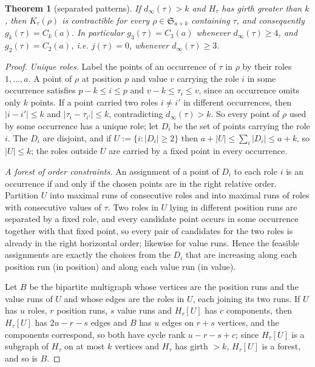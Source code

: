 \documentclass[11pt,reqno]{amsart}
\theoremstyle{plain}
\newtheorem{theorem}{Theorem}[section]
\theoremstyle{definition}
\theoremstyle{remark}
\newcommand{\Sym}{\mathfrak{S}}
\begin{document}
\begin{theorem}[separated patterns]\label{thm:separated}
If $d_\infty(\tau)>k$ and $H_\tau$ has girth greater than $k$, then $K_\tau(\rho)$ is contractible for every $\rho\in\Sym_{a+k}$ containing $\tau$, and consequently $g_k(\tau)=C_k(a)$. In particular $g_3(\tau)=C_3(a)$ whenever $d_\infty(\tau)\ge4$, and $g_2(\tau)=C_2(a)$, i.e. $j(\tau)=0$, whenever $d_\infty(\tau)\ge3$.
\end{theorem}

\begin{proof}
\emph{Unique roles.} Label the points of an occurrence of $\tau$ in $\rho$ by their roles $1,\dots,a$. A point of $\rho$ at position $p$ and value $v$ carrying the role $i$ in some occurrence satisfies $p-k\le i\le p$ and $v-k\le\tau_i\le v$, since an occurrence omits only $k$ points. If a point carried two roles $i\ne i'$ in different occurrences, then $|i-i'|\le k$ and $|\tau_i-\tau_{i'}|\le k$, contradicting $d_\infty(\tau)>k$. So every point of $\rho$ used by some occurrence has a unique role; let $D_i$ be the set of points carrying the role $i$. The $D_i$ are disjoint, and if $U:=\{i:|D_i|\ge2\}$ then $a+|U|\le\sum_i|D_i|\le a+k$, so $|U|\le k$; the roles outside $U$ are carried by a fixed point in every occurrence.

\emph{A forest of order constraints.} An assignment of a point of $D_i$ to each role $i$ is an occurrence if and only if the chosen points are in the right relative order. Partition $U$ into maximal runs of consecutive roles and into maximal runs of roles with consecutive values of $\tau$. Two roles in $U$ lying in different position runs are separated by a fixed role, and every candidate point occurs in some occurrence together with that fixed point, so every pair of candidates for the two roles is already in the right horizontal order; likewise for value runs. Hence the feasible assignments are exactly the choices from the $D_i$ that are increasing along each position run (in position) and along each value run (in value). 

Let $B$ be the bipartite multigraph whose vertices are the position runs and the value runs of $U$ and whose edges are the roles in $U$, each joining its two runs. If $U$ has $u$ roles, $r$ position runs, $s$ value runs and $H_\tau[U]$ has $c$ components, then $H_\tau[U]$ has $2u-r-s$ edges and $B$ has $u$ edges on $r+s$ vertices, and the components correspond, so both have cycle rank $u-r-s+c$; since $H_\tau[U]$ is a subgraph of $H_\tau$ on at most $k$ vertices and $H_\tau$ has girth $>k$, $H_\tau[U]$ is a forest, and so is $B$.


\end{proof}
\end{document}
